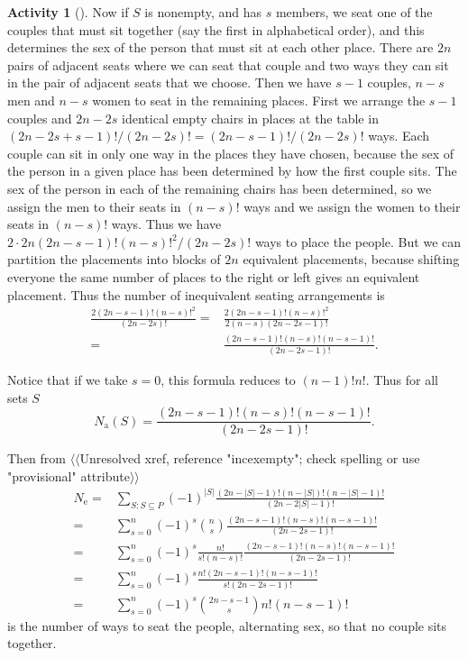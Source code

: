 \documentclass[10pt,]{book}
\theoremstyle{plain}
\theoremstyle{definition}
\newtheorem{activity}[project]{Activity}
\numberwithin{equation}{chapter}
\newcommand{\amp}{&}
\begin{document}
\begin{activity}[]
Now if \(S\) is nonempty, and has \(s\) members, we seat one of the couples that must sit together (say the first in alphabetical order), and this determines the sex of the person that must sit at each other place. There are \(2n\) pairs of adjacent seats where we can seat that couple and two ways they can sit in the pair of adjacent seats that we choose. Then we have \(s-1\) couples, \(n-s\) men and \(n-s\) women to seat in the remaining places. First we arrange the \(s-1\) couples and \(2n-2s\) identical empty chairs in places at the table in \((2n-2s+s-1)!/(2n-2s)!=(2n-s-1)!/(2n-2s)!\) ways. Each couple can sit in only one way in the places they have chosen, because the sex of the person in a given place has been determined by how the first couple sits. The sex of the person in each of the remaining chairs has been determined, so we assign the men to their seats in \((n-s)!\) ways and we assign the women to their seats in \((n-s)!\) ways. Thus we have \(2\cdot2n(2n-s-1)!(n-s)!^2/(2n-2s)!\) ways to place the people. But we can partition the placements into blocks of \(2n\) equivalent placements, because shifting everyone the same number of places to the right or left gives an equivalent placement. Thus the number of inequivalent seating arrangements is%
\begin{align*}
\frac{2(2n-s-1)!(n-s)!^2}{(2n-2s)!} =\amp \frac{2(2n-s-1)!(n-s)!^2}{2(n-s)(2n-2s-1)!}\\
=\amp \frac{(2n-s-1)!(n-s)!(n-s-1)!}{(2n-2s-1)!}.
\end{align*}
%
\par
Notice that if we take \(s=0\), this formula reduces to \((n-1)!n!\). Thus for all sets \(S\)%
\begin{equation*}
N_{\mbox{a} }(S)=\frac{(2n-s-1)!(n-s)!(n-s-1)!}{(2n-2s-1)!}.
\end{equation*}
%
\par
Then from {$\langle\langle$Unresolved xref, reference "incexempty"; check spelling or use "provisional" attribute$\rangle\rangle$}%
\begin{align*}
N_{\mbox{e} }  =\amp  \sum_{S:S\subseteq P} (-1)^{|S|}\frac{(2n-|S|-1)!(n-|S|)!(n-|S|-1)!
}{(2n-2|S|-1)!}\\
=\amp \sum_{s=0}^n(-1)^s\binom{n}{s}\frac{(2n-s-1)!(n-s)!(n-s-1)!}{(2n-2s-1)!}\\
=\amp \sum_{s=0}^n(-1)^s\frac{n!}{s!(n-s)!}\frac{(2n-s-1)!(n-s)!(n-s-1)!}{(2n-2s-1)!}\\
=\amp \sum_{s=0}^n(-1)^s \frac{n!(2n-s-1)!(n-s-1)!}{s!(2n-2s-1)!}\\
=\amp \sum_{s=0}^n(-1)^s\binom{2n-s-1}{s}n!(n-s-1)!
\end{align*}
is the number of ways to seat the people, alternating sex, so that no couple sits together.%
\end{activity}
\typeout{************************************************}
\typeout{************************************************}
\end{document}
